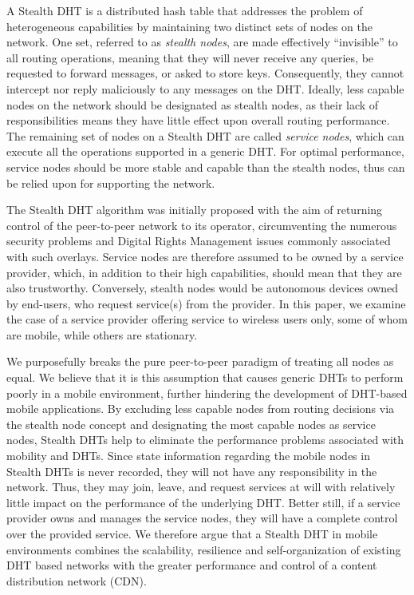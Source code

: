 \documentclass[times, 10pt,twocolumn]{article}
\begin{document}
A Stealth DHT is a distributed hash table that addresses the problem
of heterogeneous capabilities by maintaining two distinct sets of
nodes on the network. One set, referred to as {\em stealth nodes},
are made effectively ``invisible'' to all routing operations,
meaning that they will never receive any queries, be requested to
forward messages, or asked to store keys. Consequently, they cannot
intercept nor reply maliciously to any messages on the DHT. Ideally,
less capable nodes on the network should be designated as stealth
nodes, as their lack of responsibilities means they have little
effect upon overall routing performance. The remaining set of nodes
on a Stealth DHT are called {\em service nodes}, which can execute
all the operations supported in a generic DHT. For optimal
performance, service nodes should be more stable and capable than
the stealth nodes, thus can be relied upon for supporting the
network. %

The Stealth DHT algorithm was initially proposed with the aim of
returning control of the peer-to-peer network to its operator,
circumventing the numerous security problems and Digital Rights
Management issues commonly associated with such overlays. Service
nodes are therefore assumed to be owned by a service provider,
which, in addition to their high capabilities, should mean that they
are also trustworthy. Conversely, stealth nodes would be autonomous
devices owned by end-users, who request service(s) from the
provider. In this paper, we examine the case of a service provider
offering service to wireless users only, some of whom are mobile,
while others are stationary.

We purposefully breaks the pure peer-to-peer paradigm of treating
all nodes as equal. We believe that it is this assumption that
causes generic DHTs to perform poorly in a mobile environment,
further hindering the development of DHT-based mobile applications.
By excluding less capable nodes from routing decisions via the
stealth node concept and designating the most capable nodes as
service nodes, Stealth DHTs help to eliminate the performance
problems associated with mobility and DHTs. Since state information
regarding the mobile nodes in Stealth DHTs is never recorded, they
will not have any responsibility in the network. Thus, they may
join, leave, and request services at will with relatively little
impact on the performance of the underlying DHT. Better still, if a
service provider owns and manages the service nodes, they will have
a complete control over the provided service. We therefore argue
that a Stealth DHT in mobile environments combines the scalability,
resilience and self-organization of existing DHT based networks with
the greater performance and control of a content distribution
network (CDN).
\end{document}
